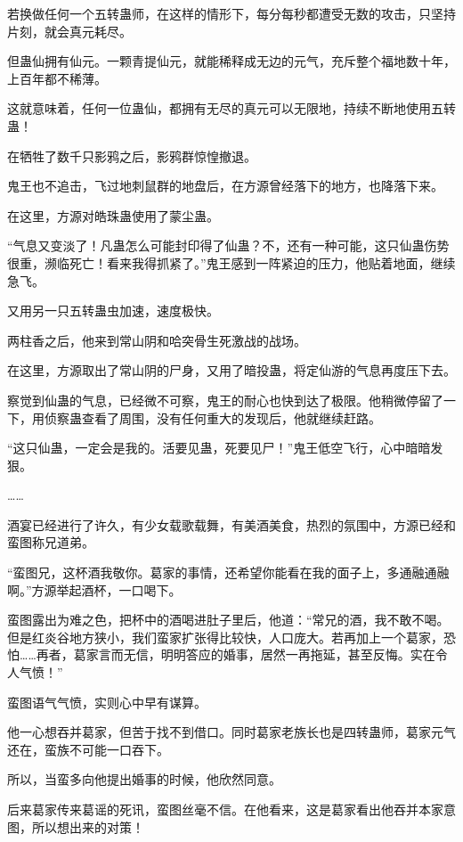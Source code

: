 \begin{this_body}
若换做任何一个五转蛊师，在这样的情形下，每分每秒都遭受无数的攻击，只坚持片刻，就会真元耗尽。

但蛊仙拥有仙元。一颗青提仙元，就能稀释成无边的元气，充斥整个福地数十年，上百年都不稀薄。

这就意味着，任何一位蛊仙，都拥有无尽的真元可以无限地，持续不断地使用五转蛊！

在牺牲了数千只影鸦之后，影鸦群惊惶撤退。

鬼王也不追击，飞过地刺鼠群的地盘后，在方源曾经落下的地方，也降落下来。

在这里，方源对皓珠蛊使用了蒙尘蛊。

“气息又变淡了！凡蛊怎么可能封印得了仙蛊？不，还有一种可能，这只仙蛊伤势很重，濒临死亡！看来我得抓紧了。”鬼王感到一阵紧迫的压力，他贴着地面，继续急飞。

又用另一只五转蛊虫加速，速度极快。

两柱香之后，他来到常山阴和哈突骨生死激战的战场。

在这里，方源取出了常山阴的尸身，又用了暗投蛊，将定仙游的气息再度压下去。

察觉到仙蛊的气息，已经微不可察，鬼王的耐心也快到达了极限。他稍微停留了一下，用侦察蛊查看了周围，没有任何重大的发现后，他就继续赶路。

“这只仙蛊，一定会是我的。活要见蛊，死要见尸！”鬼王低空飞行，心中暗暗发狠。

……

酒宴已经进行了许久，有少女载歌载舞，有美酒美食，热烈的氛围中，方源已经和蛮图称兄道弟。

“蛮图兄，这杯酒我敬你。葛家的事情，还希望你能看在我的面子上，多通融通融啊。”方源举起酒杯，一口喝下。

蛮图露出为难之色，把杯中的酒喝进肚子里后，他道：“常兄的酒，我不敢不喝。但是红炎谷地方狭小，我们蛮家扩张得比较快，人口庞大。若再加上一个葛家，恐怕……再者，葛家言而无信，明明答应的婚事，居然一再拖延，甚至反悔。实在令人气愤！”

蛮图语气气愤，实则心中早有谋算。

他一心想吞并葛家，但苦于找不到借口。同时葛家老族长也是四转蛊师，葛家元气还在，蛮族不可能一口吞下。

所以，当蛮多向他提出婚事的时候，他欣然同意。

后来葛家传来葛谣的死讯，蛮图丝毫不信。在他看来，这是葛家看出他吞并本家意图，所以想出来的对策！

\end{this_body}

